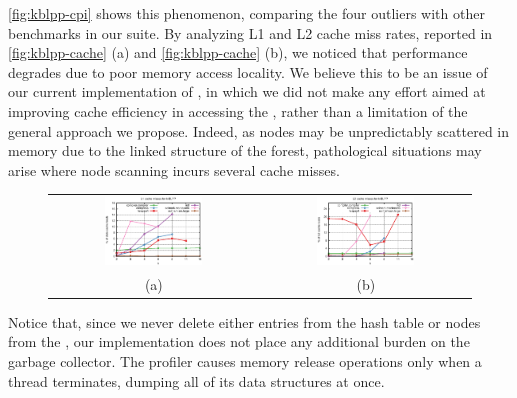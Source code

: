 \noindent \myfigure\ref{fig:kblpp-cpi} shows this phenomenon, comparing the four outliers with other benchmarks in our suite. By analyzing L1 and L2 cache miss rates, reported in \myfigure\ref{fig:kblpp-cache} (a) and \myfigure\ref{fig:kblpp-cache} (b), we noticed that performance degrades due to poor memory access locality. We believe this to be an issue of our current implementation of \kblpp, in which we did not make any effort aimed at improving cache efficiency in accessing the \ksf, rather than a limitation of the general approach we propose. Indeed, as nodes may be unpredictably scattered in memory due to the linked structure of the forest, pathological situations may arise where node scanning incurs several cache misses.

\ifdefined\noauthorea
\begin{figure}[!ht]
\begin{center}
\begin{tabular}{cc}
\hspace{-6mm}
\includegraphics[width=0.49\textwidth]{figures/kblpp-cache/kblpp-cache-L1.eps} &
\includegraphics[width=0.49\textwidth]{figures/kblpp-cache/kblpp-cache-L2.eps}\\
(a) & (b)
\end{tabular}
\caption{\protect}
\end{center}
\end{figure}
\fi

\noindent Notice that, since we never delete either entries from the hash table or nodes from the \ksf, our implementation does not place any additional burden on the garbage collector. The profiler causes memory release operations only when a thread terminates, dumping all of its data structures at once.


